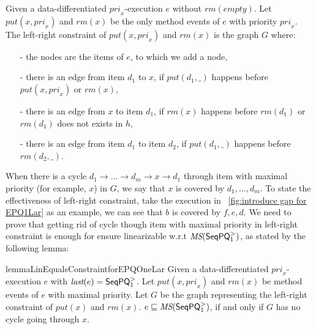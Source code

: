 \begin{definition}\label{def:left-right constraint for matched put and rm operations}
Given a data-differentiated $\textit{pri}_x$-execution $e$ without $\textit{rm}(\textit{empty})$. Let $\textit{put}(x,\textit{pri}_x)$ and $\textit{rm}(x)$ be the only  method events of $e$ with priority $\textit{pri}_x$. The left-right constraint of $\textit{put}(x,\textit{pri}_x)$ and $\textit{rm}(x)$ is the graph $G$ where:

\begin{itemize}
\setlength{\itemsep}{0.5pt}
\item[-] the nodes are the items of $e$, to which we add a node,

\item[-] there is an edge from item $d_1$ to $x$, if $\textit{put}(d_1,\_)$ happens before $\textit{put}(x,\textit{pri}_x)$ or $\textit{rm}(x)$,

\item[-] there is an edge from $x$ to item $d_1$, if $\textit{rm}(x)$ happens before $\textit{rm}(d_1)$ or $\textit{rm}(d_1)$ does not exists in $h$,

\item[-] there is an edge from item $d_1$ to item $d_2$, if $\textit{put}(d_1,\_)$ happens before $\textit{rm}(d_2,\_)$.
\end{itemize}
\end{definition}

When there is a cycle $d_1 \rightarrow \ldots \rightarrow d_m \rightarrow x \rightarrow d_1$ through item with maximal priority (for example, $x$) in $G$, we say that $x$ is covered by $d_1,\ldots,d_m$. To state the effectiveness of left-right constraint, take the execution in \figurename~\ref{fig:introduce gap for EPQ1Lar} as an example, we can see that $b$ is covered by $f,e,d$. We need to prove that getting rid of cycle though item with maximal priority in left-right constraint is enough for ensure linearizable w.r.t $\textit{MS}(\mathsf{SeqPQ}_1^{>})$, as stated by the following lemma:

\begin{restatable}{lemma}{LinEqualsConstraintforEPQOneLar}
\label{lemma:Lin Equals Constraint for EPQ1Lar}
Given a data-differentiated $\textit{pri}_x$-execution $e$ with $\textit{last}(e) = \mathsf{SeqPQ}_1^{>}$. Let $\textit{put}(x,\textit{pri}_x)$ and $\textit{rm}(x)$ be method events of $e$ with maximal priority. Let $G$ be the graph representing the left-right constraint of $\textit{put}(x)$ and $\textit{rm}(x)$. $e \sqsubseteq \textit{MS}(\mathsf{SeqPQ}_1^{>})$, if and only if $G$ has no cycle going through $x$.
\end{restatable}



